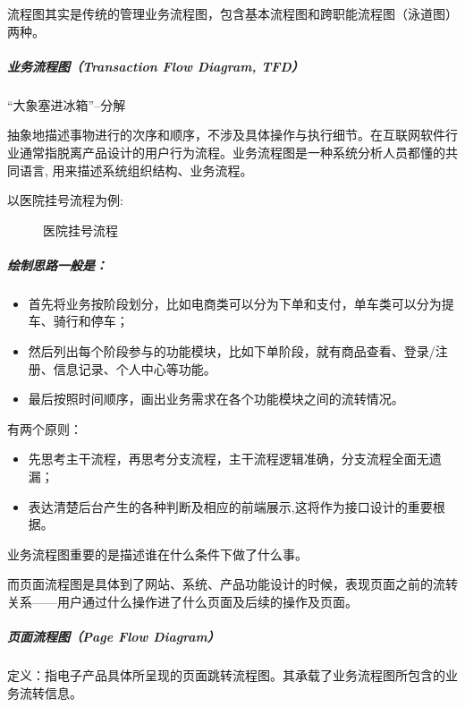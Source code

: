 \documentclass[letterpaper,11pt,english]{sphinxmanual}
\begin{document}
流程图其实是传统的管理业务流程图，包含基本流程图和跨职能流程图（泳道图）两种。


\subparagraph{业务流程图（Transaction Flow Diagram, TFD）}
\label{\detokenize{chapter_skill/flow_chart:transaction-flow-diagram-tfd}}
“大象塞进冰箱”–分解

抽象地描述事物进行的次序和顺序，不涉及具体操作与执行细节。在互联网软件行业通常指脱离产品设计的用户行为流程。业务流程图是一种系统分析人员都懂的共同语言,
用来描述系统组织结构、业务流程。

以医院挂号流程为例:

\begin{figure}[H]
\centering
\capstart

\noindent{}
\caption{医院挂号流程}\label{\detokenize{chapter_skill/flow_chart:id17}}\end{figure}


\subparagraph{绘制思路一般是：}
\label{\detokenize{chapter_skill/flow_chart:id6}}\begin{itemize}
\item {} 
首先将业务按阶段划分，比如电商类可以分为下单和支付，单车类可以分为提车、骑行和停车；

\item {} 
然后列出每个阶段参与的功能模块，比如下单阶段，就有商品查看、登录/注册、信息记录、个人中心等功能。

\item {} 
最后按照时间顺序，画出业务需求在各个功能模块之间的流转情况。

\end{itemize}

有两个原则：
\begin{itemize}
\item {} 
先思考主干流程，再思考分支流程，主干流程逻辑准确，分支流程全面无遗漏；

\item {} 
表达清楚后台产生的各种判断及相应的前端展示,这将作为接口设计的重要根据。

\end{itemize}

业务流程图重要的是描述谁在什么条件下做了什么事。

而页面流程图是具体到了网站、系统、产品功能设计的时候，表现页面之前的流转关系——用户通过什么操作进了什么页面及后续的操作及页面。


\subparagraph{页面流程图（Page Flow Diagram）}
\label{\detokenize{chapter_skill/flow_chart:page-flow-diagram}}
定义：指电子产品具体所呈现的页面跳转流程图。其承载了业务流程图所包含的业务流转信息。
\end{document}
